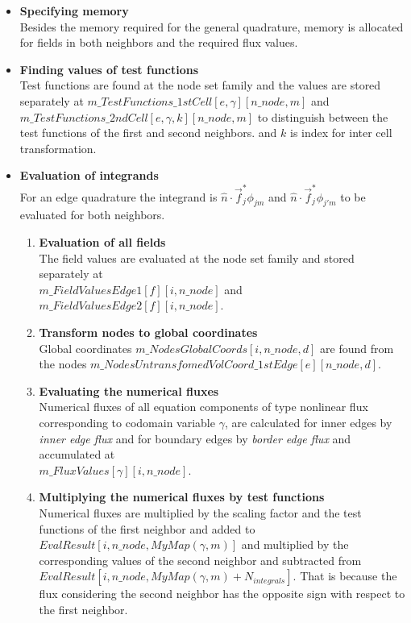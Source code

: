 \documentclass[BoSSSForSolvingConservationLaws.tex]{subfiles}
\begin{document}
\begin{itemize}
\begin{figure}[h]
\label{fig:NodeSetFamily}
\end{figure}
\item \textbf{Specifying memory}\\
Besides the memory required for the general quadrature, memory is allocated for fields in both neighbors and the required flux values.
\item \textbf{Finding values of test functions}\\
Test functions are found at the node set family and the values are stored separately at $m\_TestFunctions\_1stCell[e, \gamma][n\_node,m]$ and $m\_TestFunctions\_2ndCell[e, \gamma, k][n\_node,m]$ to distinguish between the test functions of the first and second neighbors.  and $k$ is index for inter cell transformation.
\item \textbf{Evaluation of integrands}\\
For an edge quadrature the integrand is $\hat{n}\cdot \vec{f}_j^* \phi_{jm}$ and $\hat{n}\cdot \vec{f}_j^* \phi_{j'm}$ to be evaluated for both neighbors.
\begin{enumerate}
\item \textbf{Evaluation of all fields}\\
The field values are evaluated at the node set family and stored separately at \\$m\_FieldValuesEdge1[f][i,n\_node]$ and $m\_FieldValuesEdge2[f][i,n\_node]$.
\item \textbf{Transform nodes to global coordinates}\\
Global coordinates $m\_NodesGlobalCoords[i,n\_node,d]$ are found from the nodes $m\_NodesUntransfomedVolCoord\_1stEdge[e][n\_node,d]$.
\item \textbf{Evaluating the numerical fluxes}\\
Numerical fluxes of all equation components of type nonlinear flux corresponding to codomain variable $\gamma$, are calculated for inner edges by \emph{inner edge flux} and for boundary edges by \emph{border edge flux} and accumulated at \\$m\_FluxValues[\gamma][i,n\_node]$.
\item \textbf{Multiplying the numerical fluxes by test functions}\\
Numerical fluxes are multiplied by the scaling factor and the test functions of the first neighbor and added to $EvalResult[i, n\_node, MyMap(\gamma, m)]$ and multiplied by the corresponding values of the second neighbor and subtracted from $EvalResult[i, n\_node, MyMap(\gamma, m)+N_{integrals}]$. That is because the flux considering the second neighbor has the opposite sign with respect to the first neighbor.

\end{enumerate}
\end{itemize}
\end{document}
